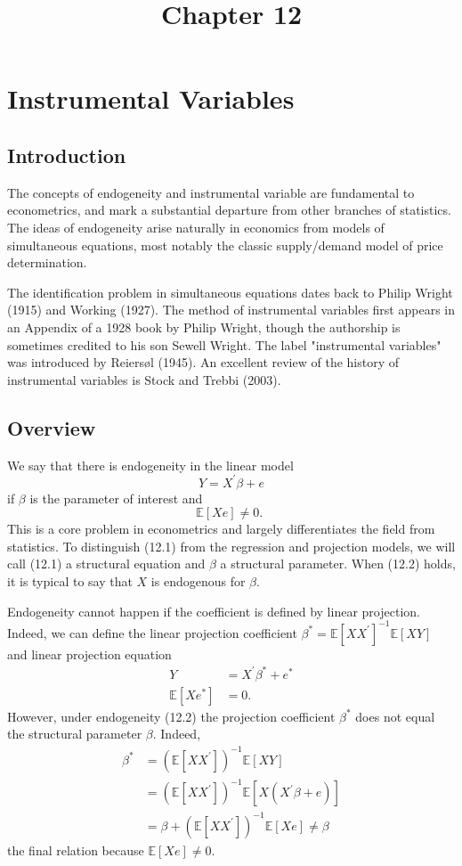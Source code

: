 \documentclass[10pt]{article}
\title{Chapter 12 }
\author{}
\date{}
\begin{document}
\maketitle
\section{Instrumental Variables}
\subsection{Introduction}
The concepts of endogeneity and instrumental variable are fundamental to econometrics, and mark a substantial departure from other branches of statistics. The ideas of endogeneity arise naturally in economics from models of simultaneous equations, most notably the classic supply/demand model of price determination.

The identification problem in simultaneous equations dates back to Philip Wright (1915) and Working (1927). The method of instrumental variables first appears in an Appendix of a 1928 book by Philip Wright, though the authorship is sometimes credited to his son Sewell Wright. The label "instrumental variables" was introduced by Reiersøl (1945). An excellent review of the history of instrumental variables is Stock and Trebbi (2003).

\subsection{Overview}
We say that there is endogeneity in the linear model
$$
Y=X^{\prime} \beta+e
$$
if $\beta$ is the parameter of interest and
$$
\mathbb{E}[X e] \neq 0 \text {. }
$$
This is a core problem in econometrics and largely differentiates the field from statistics. To distinguish (12.1) from the regression and projection models, we will call (12.1) a structural equation and $\beta$ a structural parameter. When (12.2) holds, it is typical to say that $X$ is endogenous for $\beta$.

Endogeneity cannot happen if the coefficient is defined by linear projection. Indeed, we can define the linear projection coefficient $\beta^{*}=\mathbb{E}\left[X X^{\prime}\right]^{-1} \mathbb{E}[X Y]$ and linear projection equation
$$
\begin{aligned}
Y &=X^{\prime} \beta^{*}+e^{*} \\
\mathbb{E}\left[X e^{*}\right] &=0 .
\end{aligned}
$$
However, under endogeneity (12.2) the projection coefficient $\beta^{*}$ does not equal the structural parameter $\beta$. Indeed,
$$
\begin{aligned}
\beta^{*} &=\left(\mathbb{E}\left[X X^{\prime}\right]\right)^{-1} \mathbb{E}[X Y] \\
&=\left(\mathbb{E}\left[X X^{\prime}\right]\right)^{-1} \mathbb{E}\left[X\left(X^{\prime} \beta+e\right)\right] \\
&=\beta+\left(\mathbb{E}\left[X X^{\prime}\right]\right)^{-1} \mathbb{E}[X e] \neq \beta
\end{aligned}
$$
the final relation because $\mathbb{E}[X e] \neq 0$.
\end{document}
